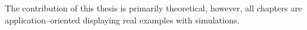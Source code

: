 %
The contribution of this thesis is primarily theoretical, however, all chapters are application--oriented displaying real examples with simulations.


%
%
%
%

